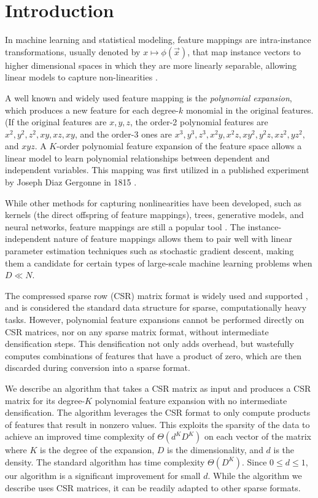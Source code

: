 \documentclass{article}
\begin{document}
\section{Introduction}

In machine learning and statistical modeling, feature mappings are intra-instance transformations, usually denoted by $x \mapsto \phi(\vec{x})$, that map instance vectors to higher dimensional spaces in which they are more linearly separable, allowing linear models to capture non-linearities \cite{yuan2012recent}.

A well known and widely used feature mapping is the \emph{polynomial expansion}, which produces a new feature for each degree-$k$ monomial in the original features. (If the original features are $x,y,z$, the order-2 polynomial features are $x^2, y^2, z^2, xy, xz, xy$, and the order-3 ones are $x^3, y^3, z^3, x^2y, x^2z, xy^2, y^2 z, xz^2, yz^2,$ and $xyz$.
A $K$-order polynomial feature expansion of the feature space allows a linear model to learn polynomial relationships between dependent and independent variables.
This mapping was first utilized in a published experiment by Joseph Diaz Gergonne in 1815 \cite{gergonne1974application, smith1918standard}.

While other methods for capturing nonlinearities have been developed, such as kernels (the direct offspring of feature mappings), trees, generative models, and neural networks, feature mappings are still a popular tool \cite{barker200114, chang2010training, shaw2006intellectual}.
The instance-independent nature of feature mappings allows them to pair well with linear parameter estimation techniques such as stochastic gradient descent, making them a candidate for certain types of large-scale machine learning problems when $D \ll N$.

The compressed sparse row (CSR) matrix format \cite{saad1994sparskit} is widely used \cite{liu2012sparse, bulucc2009parallel, bell2008efficient, white1997improving} and supported \cite{eigenweb, bastien2012theano, scikit-learn, koenker2003sparsem}, and is considered the standard data structure for sparse, computationally heavy tasks.
However, polynomial feature expansions cannot be performed directly on CSR matrices, nor on any sparse matrix format, without intermediate densification steps.
This densification not only adds overhead, but wastefully computes combinations of features that have a product of zero, which are then discarded during conversion into a sparse format.

We describe an algorithm that takes a CSR matrix as input and produces a CSR matrix for its degree-$K$ polynomial feature expansion with no intermediate densification.
The algorithm leverages the CSR format to only compute products of features that result in nonzero values.
This exploits the sparsity of the data to achieve an improved time complexity of $\Theta(d^KD^K)$ on each vector of the matrix where $K$ is the degree of the expansion, $D$ is the dimensionality, and $d$ is the density.
The standard algorithm has time complexity $\Theta(D^K)$.
Since $0 \le d \le 1$, our algorithm is a significant improvement for small $d$.
While the algorithm we describe uses CSR matrices, it can be readily adapted to other sparse formats.
\end{document}
